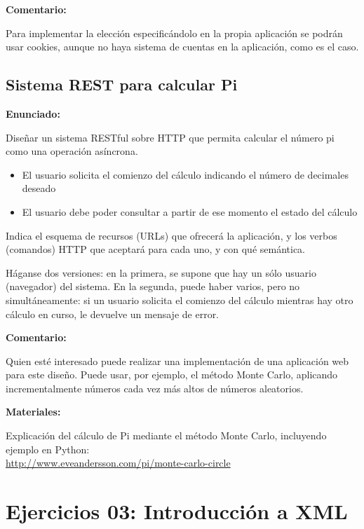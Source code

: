 \textbf{Comentario:}

Para implementar la elección especificándolo en la propia aplicación se podrán usar cookies, aunque no haya sistema de cuentas en la aplicación, como es el caso.

\subsection{Sistema REST para calcular Pi}
\label{subsec:rest-pi}

\textbf{Enunciado:}

Diseñar un sistema RESTful sobre HTTP que permita calcular el número pi como una operación asíncrona.

\begin{itemize}
\item El usuario solicita el comienzo del cálculo indicando el número de decimales deseado
\item El usuario debe poder consultar a partir de ese momento el estado del cálculo
\end{itemize}

Indica el esquema de recursos (URLs) que ofrecerá la aplicación, y los verbos (comandos) HTTP que aceptará para cada uno, y con qué semántica.

Háganse dos versiones: en la primera, se supone que hay un sólo usuario (navegador) del sistema. En la segunda, puede haber varios, pero no simultáneamente: si un usuario solicita el comienzo del cálculo mientras hay otro cálculo en curso, le devuelve un mensaje de error.

\textbf{Comentario:}

Quien esté interesado puede realizar una implementación de una aplicación web para este diseño. Puede usar, por ejemplo, el método Monte Carlo, aplicando incrementalmente números cada vez más altos de números aleatorios.

\textbf{Materiales:}

Explicación del cálculo de Pi mediante el método Monte Carlo, incluyendo ejemplo en Python: \\
\url{http://www.eveandersson.com/pi/monte-carlo-circle}


\section{Ejercicios 03: Introducción a XML}


